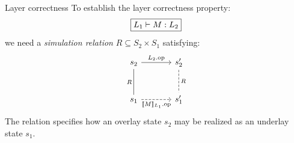 \documentclass[aspectratio=54]{beamer}
\newcommand{\kw}[1]{\ensuremath{ \mathrm{#1} }}
\newcommand{\bdot}{\boldsymbol{\cdot}}
\begin{document}
\begin{frame}[fragile]{Layer correctness} %
  To establish the layer correctness property:
  \[
    \fbox{$L_1 \vdash M : L_2$}
  \]
  we need a \emph{simulation relation}
  $R \subseteq S_2 \times S_1$ satisfying:
  \[
    \begin{tikzcd}[sep=large]
      s_2 \ar[r, "L_2.\kw{op}"] \ar[d, "R"', dash] &
      s_2' \ar[d, "R", dash, dashed] \\
      s_1 \ar[r, "\llbracket M \rrbracket_{L_1}.\kw{op}"', dashed] &
      s_1'
    \end{tikzcd}
  \]
  The relation specifies how an overlay state $s_2$
  may be realized as an underlay state $s_1$.
\end{frame}

%
%
%
%
\end{document}
